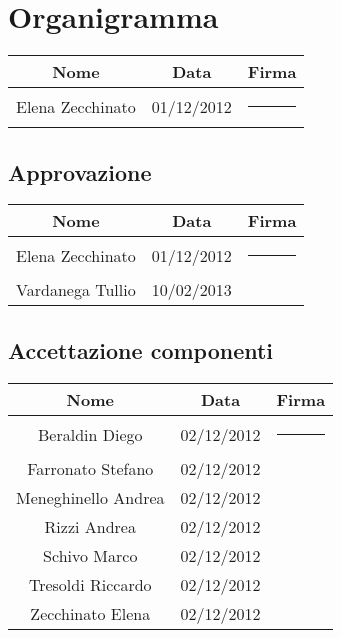 \section{Organigramma}
\begin{center}
\begin{tabularx}{0.8\textwidth}{c|c|c}
{\bf Nome}&{\bf Data}&{\bf Firma}\\ 
\hline
Elena Zecchinato & 01/12/2012 &\rule{3cm}{0cm} \\
\end{tabularx}
\end{center}

\subsection{Approvazione}
\begin{center}
\begin{tabularx}{0.8\textwidth}{c|c|c}
{\bf Nome}&{\bf Data}&{\bf Firma}\\ 
\hline
Elena Zecchinato & 01/12/2012 &\rule{3cm}{0cm} \\
Vardanega Tullio & 10/02/2013 & \\
\end{tabularx}
\end{center}

\subsection{Accettazione componenti}
\begin{center}
\begin{tabularx}{0.9\textwidth}{c|c|c}
{\bf Nome}&{\bf Data}&{\bf Firma }\\ 
\hline
Beraldin Diego & 02/12/2012&\rule{3cm}{0cm}\\
Farronato Stefano & 02/12/2012&\\
Meneghinello Andrea & 02/12/2012&\\
Rizzi Andrea & 02/12/2012&\\
Schivo Marco & 02/12/2012&\\
Tresoldi Riccardo & 02/12/2012&\\
Zecchinato Elena & 02/12/2012&\\
\end{tabularx}
\end{center}

